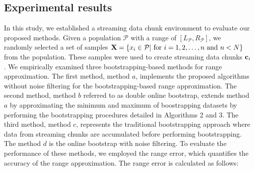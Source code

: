 \documentclass[a4paper,fleqn]{cas-dc}
\begin{document}
\subsection{Experimental results}
In this study, we established a streaming data chunk environment to evaluate 
our proposed methods. Given a population $\mathcal{P}$ with a range of $[L_{\mathcal{P}},R_{\mathcal{P}}]$, we randomly selected a set of samples ${\bf X} = \left\{x_i \in \mathcal{P}|\,\,{\rm for}\,
\,i=1,2,\ldots,n\,\,{\rm and}\,\, n<N\right\}$ from the population. These samples were used to create 
streaming data chunks ${\bf c}_i$. We empirically examined three bootstrapping-based methods for 
range approximation. The first method, method $a$, implements the proposed algorithms without noise 
filtering for the bootstrapping-based range approximation. The second method, method $b$ referred to as double 
online bootstrap, extends method $a$ by approximating the minimum and maximum of boostrapping datasets by performing the 
bootstrapping procedures detailed in Algorithms 2 and 3. The third method, method $c$, 
represents the traditional bootstrapping approach where data from streaming chunks are accumulated before performing 
bootstrapping. The method $d$ is the online bootstrap with noise filtering. To evaluate the 
performance of these methods, we employed the range error, which quantifies the accuracy of the range approximation. The range error is calculated as follows:

\end{document}
